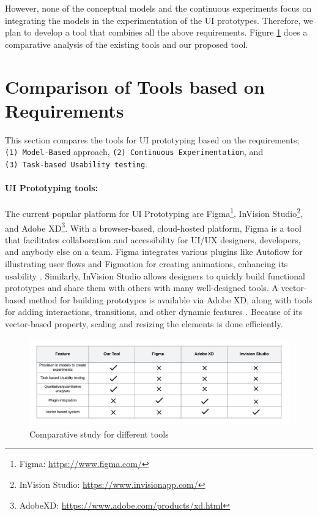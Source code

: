 However, none of the conceptual models and the continuous experiments focus on integrating the models in the experimentation of the UI prototypes.
Therefore, we plan to develop a tool that combines all the above requirements.
Figure \ref{relatedwork:img:comparative} does a comparative analysis of the existing tools and our proposed tool.
\section{Comparison of Tools based on Requirements}
This section compares the tools for UI prototyping based on the requirements;\\ \texttt{(1) Model-Based} approach, \texttt{(2) Continuous Experimentation}, and \\ \texttt{(3) Task-based Usability testing}.

\paragraph{UI Prototyping tools:} The current popular platform for UI Prototyping are Figma\footnote{Figma: \url{https://www.figma.com/}}, InVision Studio\footnote{InVision Studio: \url{https://www.invisionapp.com/}}, and Adobe XD\footnote{AdobeXD: \url{https://www.adobe.com/products/xd.html}}.
With a browser-based, cloud-hosted platform, Figma is a tool that facilitates collaboration and accessibility for UI/UX designers, developers, and anybody else on a team.
Figma integrates various plugins like Autoflow for illustrating user flows and Figmotion for creating animations, enhancing its usability \cite{article:comparative:prototypes}.
Similarly, InVision Studio allows designers to quickly build functional prototypes and share them with others with many well-designed tools.
A vector-based method for building prototypes is available via Adobe XD, along with tools for adding interactions, transitions, and other dynamic features \cite{article:comparative:prototypes}.
Because of its vector-based property, scaling and resizing the elements is done efficiently.

\begin{figure}[ht]
    \centering
    \includegraphics[scale=0.28]{images/related-work/Comparative.png}
    \caption{Comparative study for different tools}
    \label{relatedwork:img:comparative}
\end{figure}
